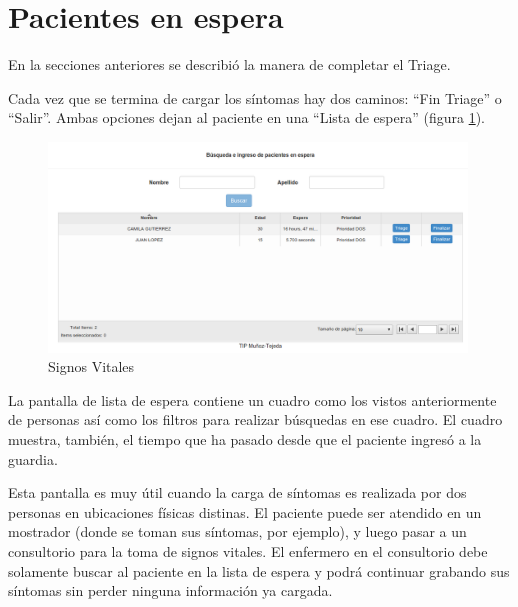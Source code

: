 \section{Pacientes en espera}
En la secciones anteriores se describió la manera de completar el Triage. 

Cada vez que se termina de cargar los síntomas hay dos caminos: ``Fin Triage'' o ``Salir''. Ambas opciones dejan al paciente en una ``Lista de espera'' (figura \ref{fig:espera}).
\begin{figure}
\centerline{\includegraphics[width=0.99\textwidth]{espera.png}}
\caption{Signos Vitales} \label{fig:espera}
\end{figure}
 La pantalla de lista de espera contiene un cuadro como los vistos anteriormente de personas así como los filtros para realizar búsquedas en ese cuadro. El cuadro muestra, también, el tiempo que ha pasado desde que el paciente ingresó a la guardia.

Esta pantalla es muy útil cuando la carga de síntomas es realizada por dos personas en ubicaciones físicas distinas. El paciente puede ser atendido en un mostrador (donde se toman sus síntomas, por ejemplo), y luego pasar a un consultorio para la toma de signos vitales. El enfermero en el consultorio debe solamente buscar al paciente en la lista de espera y podrá continuar grabando sus síntomas sin perder ninguna información ya cargada.

